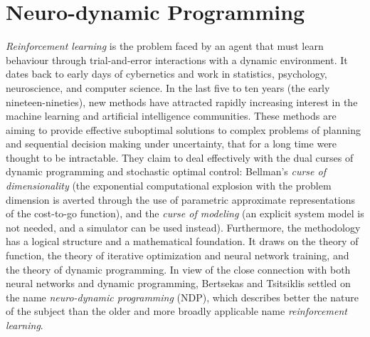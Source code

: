 \chapter{Neuro-dynamic Programming} \label{cha:neurodynamic}
 
\nocite{Viertl97}
\nocite{Mehlmann97}
\nocite{Tesauro92}
\nocite{lig*Tesauro94}
\nocite{lig*Tesauro95}
\nocite{lig*Tesauro89}
\nocite{lig*Schraudolph94}
\nocite{lig*Epstein94}
\nocite{lig*Lee90}
\nocite{Schaeffer92}
\nocite{Goerz95}
\nocite{Singh96}
\nocite{Sutton92}
\nocite{Berliner90}
\nocite{Kaelbling96}
\nocite{Lin92}
\nocite{Singh92}
\nocite{Parra93}
\nocite{Elmenreich98}
\nocite{Reiser94}
\nocite{Kaindl89}
\nocite{Pearl84}
\nocite{Sedgewick92}
\nocite{Dawid96}
\nocite{Michalewicz96}
\nocite{Atkinson93}
\nocite{Bramer83}
\nocite{Binmore92}
\nocite{Schildt96}
\nocite{Sutton93}
\nocite{Littman96}

{\em Reinforcement learning} is the problem faced by an agent that must learn behaviour through trial-and-error interactions with a dynamic environment. It dates back to early days of cybernetics and work in statistics, psychology, neuroscience, and computer science. In the last five to ten years (the early nineteen-nineties), new methods have attracted rapidly increasing interest in the machine learning and artificial intelligence communities. These methods are aiming to provide effective suboptimal solutions to complex problems of planning and sequential decision making under uncertainty, that for a long time were thought to be intractable. They claim to deal effectively with the dual curses of dynamic programming and stochastic optimal control: Bellman's {\em curse of dimensionality} (the exponential computational explosion with the problem dimension is averted through the use of parametric approximate representations of the cost-to-go function), and the {\em curse of modeling} (an explicit system model is not needed, and a simulator can be used instead). Furthermore, the methodology has a logical structure and a mathematical foundation. It draws on the theory of function, the theory of iterative optimization and neural network training, and the theory of dynamic programming. In view of the close connection with both neural networks and dynamic programming, Bertsekas and Tsitsiklis \cite{Bertsekas96} settled on the name {\em neuro-dynamic programming} (NDP), 
which describes better the nature of the subject than the older and more broadly applicable name {\em reinforcement learning}.

